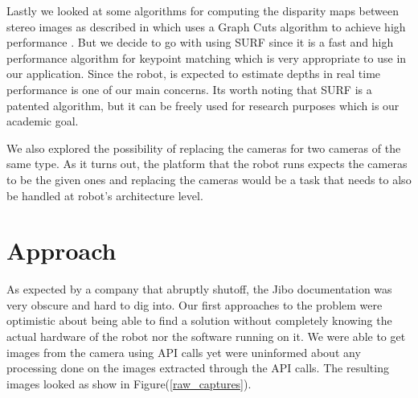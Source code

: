 \documentclass[12pt,letterpaper]{article}
\begin{document}
Lastly we looked at some algorithms for computing the disparity maps between stereo images as described in which uses a Graph Cuts algorithm to achieve high performance \cite{tappen2003comparison}. But we decide to go with using SURF \cite{bay2006surf} since it is a fast and high performance algorithm for keypoint matching which is very appropriate to use in our application. Since the robot, is expected to estimate depths in real time performance is one of our main concerns. Its worth noting that SURF is a patented algorithm, but it can be freely used for research purposes which is our academic goal.

We also explored the possibility of replacing the cameras for two cameras of the same type. As it turns out, the platform that the robot runs expects the cameras to be the given ones and replacing the cameras would be a task that needs to also be handled at robot's architecture level.

\section{Approach}
As expected by a company that abruptly shutoff, the Jibo documentation was very obscure and hard to dig into. Our first approaches to the problem were optimistic about being able to find a solution without completely knowing the actual hardware of the robot nor the software running on it. We were able to get images from the camera using API calls yet were uninformed about any processing done on the images extracted through the API calls. The resulting images looked as show in Figure(\ref{raw_captures}).
\end{document}
